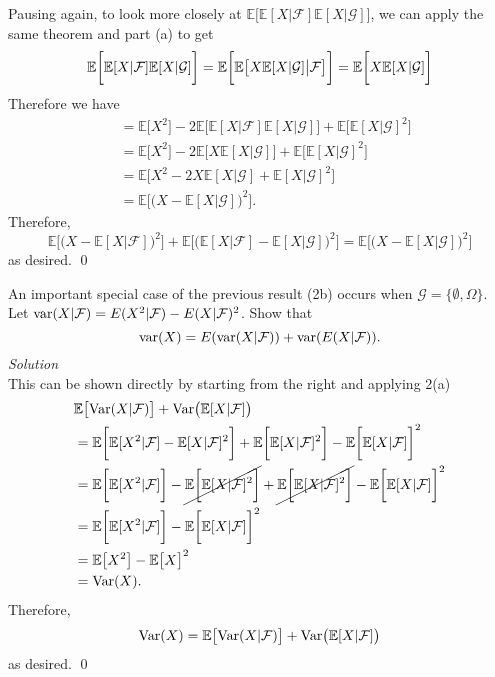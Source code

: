 \documentclass[10pt]{amsart}
\begin{document}
Pausing again, to look more closely at $\mathbb E\big[\mathbb E[X|\mathcal{F}] \mathbb E[X|\mathcal{G}]\big]$, we can apply the same theorem and part (a) to get
$$
\mathbb E\bigg[\mathbb E[X|\mathcal{F}] \mathbb E[X|\mathcal{G}]\bigg]
	= \mathbb E\bigg[\mathbb E\big[X \mathbb E[X|\mathcal{G}] \big|\mathcal{F}\big] \bigg] \\
	= \mathbb E\bigg[ X \mathbb E[X|\mathcal{G}] \bigg]
$$
Therefore we have
\begin{align*}
	&= \mathbb E\bigg[X^2\bigg]
		- 2\mathbb E\bigg[\mathbb E[X|\mathcal{F}] \mathbb E[X|\mathcal{G}]\bigg]
		+ \mathbb E\bigg[\mathbb E[X|\mathcal{G}]^2\bigg] \\
	&= \mathbb E\bigg[X^2\bigg] - 2\mathbb E\bigg[X\mathbb E[X|\mathcal{G}]\bigg] + \mathbb E\bigg[\mathbb E[X|\mathcal{G}]^2\bigg] \\
	&= \mathbb E\bigg[X^2 - 2X\mathbb E[X|\mathcal{G}] + \mathbb E[X|\mathcal{G}]^2\bigg] \\
	&= \mathbb E\bigg[\big(X - \mathbb E[X|\mathcal{G}]\big)^2\bigg].
\end{align*}
Therefore, 
$$
\mathbb E\big[\big(X - \mathbb E[X|\mathcal{F}]\big)^2\big] + \mathbb E\big[\big(\mathbb E[X|\mathcal{F}] - \mathbb E[X|\mathcal{G}]\big)^2\big]
	=  \mathbb E\big[\big(X - \mathbb E[X|\mathcal{G}]\big)^2\big]
$$
as desired.
\qed
\\
\newpage

 An important special case of the previous result (2b) occurs when $\mathcal{G} = \{\emptyset, \Omega \}$.  Let ${\rm var}(X|\mathcal{F})=E(X^2|\mathcal{F})-E(X|\mathcal{F})^2$. Show that 
$${\rm var}(X)=E({\rm var}(X|\mathcal{F}))+{\rm var}(E(X|\mathcal{F})).$$
\textit{Solution} \\
This can be shown directly by starting from the right and applying 2(a)
\begin{align*}
&\mathbb E\big[{\rm Var}(X|\mathcal{F})\big]+{\rm Var}\big(\mathbb E[X|\mathcal{F}]\big) \\
	&= \mathbb E\bigg[ \mathbb E[X^2|\mathcal{F}] - \mathbb E[X|\mathcal{F}]^2 \bigg]
		+ \mathbb E \bigg[\mathbb E[X|\mathcal{F}]^2\bigg]
		- \mathbb E \bigg[\mathbb E[X|\mathcal{F}]\bigg]^2 \\
	&= \mathbb E\bigg[ \mathbb E[X^2|\mathcal{F}]\bigg]
		- \cancel{\mathbb E \bigg[\mathbb E[X|\mathcal{F}]^2 \bigg]}
		+ \cancel{\mathbb E \bigg[\mathbb E[X|\mathcal{F}]^2\bigg]}
		- \mathbb E \bigg[\mathbb E[X|\mathcal{F}]\bigg]^2 \\
	&= \mathbb E\bigg[ \mathbb E[X^2|\mathcal{F}]\bigg] - \mathbb E \bigg[\mathbb E[X|\mathcal{F}]\bigg]^2 \\
	&= \mathbb E\big[ X^2\big] - \mathbb E \big[X \big]^2 \\
	&= {\rm Var}(X).
\end{align*}
Therefore, 
$$
{\rm Var}(X) = \mathbb E\big[{\rm Var}(X|\mathcal{F})\big]+{\rm Var}\big(\mathbb E[X|\mathcal{F}]\big)
$$
as desired.
\qed \\
\newpage
\end{document}
